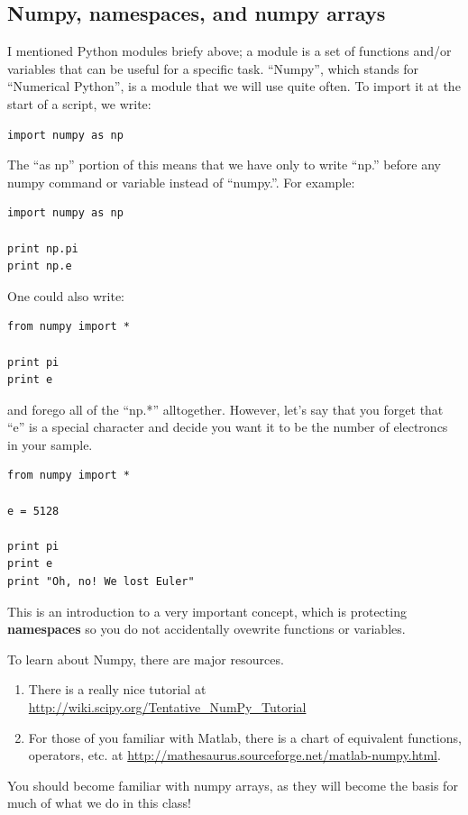 \documentclass[a4paper,10pt]{scrartcl}
\begin{document}
\subsection{Numpy, namespaces, and numpy arrays}

I mentioned Python modules briefy above; a module is a set of functions and/or variables that can be useful for a specific task. ``Numpy'', which stands for ``Numerical Python'', is a module that we will use quite often. To import it at the start of a script, we write:
\begin{lstlisting}
import numpy as np
\end{lstlisting}
The ``as np'' portion of this means that we have only to write ``np.'' before any numpy command or variable instead of ``numpy.''. For example:
\begin{lstlisting}
import numpy as np

print np.pi
print np.e
\end{lstlisting}

One could also write:
\begin{lstlisting}
from numpy import *

print pi
print e
\end{lstlisting}
and forego all of the ``np.*'' alltogether. However, let's say that you forget that ``e'' is a special character and decide you want it to be the number of electroncs in your sample.
\begin{lstlisting}
from numpy import *

e = 5128

print pi
print e
print "Oh, no! We lost Euler"
\end{lstlisting}
This is an introduction to a very important concept, which is protecting \textbf{namespaces} so you do not accidentally ovewrite functions or variables. 

To learn about Numpy, there are major resources.

\begin{enumerate}
 \item There is a really nice tutorial at \url{http://wiki.scipy.org/Tentative_NumPy_Tutorial}
 \item For those of you familiar with Matlab, there is a chart of equivalent functions, operators, etc. at \url{http://mathesaurus.sourceforge.net/matlab-numpy.html}.
\end{enumerate}

You should become familiar with numpy arrays, as they will become the basis for much of what we do in this class!
\end{document}
